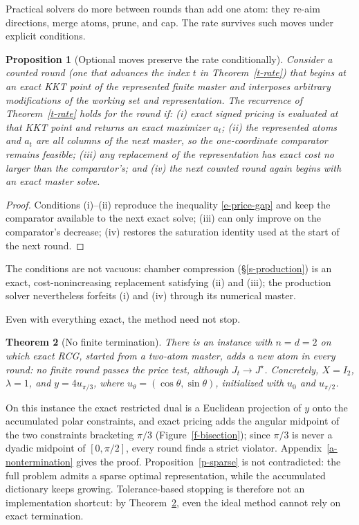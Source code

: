\documentclass[12pt]{article}
\theoremstyle{plain}
\newtheorem{theorem}{Theorem}
\newtheorem{proposition}[theorem]{Proposition}
\theoremstyle{definition}
\begin{document}
Practical solvers do more between rounds than add one atom: they re-aim
directions, merge atoms, prune, and cap. The rate survives such moves under
explicit conditions.

\begin{proposition}[Optional moves preserve the rate conditionally]
\label{p-optional}
Consider a counted round (one that advances the index $t$ in
Theorem~\ref{t-rate}) that begins at an exact KKT point of the represented
finite master and interposes arbitrary modifications of the working set and
representation. The recurrence of Theorem~\ref{t-rate} holds for the round if:
(i) exact signed pricing is evaluated at that KKT point and returns an exact
maximizer $a_t$; (ii) the represented atoms and $a_t$ are all columns of the
next master, so the one-coordinate comparator remains feasible; (iii) any
replacement of the representation has exact cost no larger than the
comparator's; and (iv) the next counted round again begins with an exact
master solve.
\end{proposition}

\begin{proof}
Conditions (i)--(ii) reproduce the inequality \eqref{e-price-gap} and keep the
comparator available to the next exact solve; (iii) can only improve on the
comparator's decrease; (iv) restores the saturation identity used at the start
of the next round.
\end{proof}

The conditions are not vacuous: chamber compression (\S\ref{s-production}) is
an exact, cost-nonincreasing replacement satisfying (ii) and (iii); the
production solver nevertheless forfeits (i) and (iv) through its numerical
master.

Even with everything exact, the method need not stop.

\begin{theorem}[No finite termination]\label{t-nontermination}
There is an instance with $n=d=2$ on which exact RCG, started from a
two-atom master, adds a new atom in every round: no finite round passes the
price test, although $J_t\to J^\star$. Concretely, $X=I_2$, $\lambda=1$, and
$y=4u_{\pi/3}$, where $u_\theta=(\cos\theta,\sin\theta)$, initialized with
$u_0$ and $u_{\pi/2}$.
\end{theorem}

On this instance the exact restricted dual is a Euclidean projection of $y$
onto the accumulated polar constraints, and exact pricing adds the angular
midpoint of the two constraints bracketing $\pi/3$ (Figure~\ref{f-bisection});
since $\pi/3$ is never a dyadic midpoint of $[0,\pi/2]$, every round finds a
strict violator. Appendix~\ref{a-nontermination} gives the proof.
Proposition~\ref{p-sparse} is not contradicted: the full problem admits a
sparse optimal representation, while the accumulated dictionary keeps growing.
Tolerance-based stopping is therefore not an implementation shortcut: by
Theorem~\ref{t-nontermination}, even the ideal method cannot rely on exact
termination.
\end{document}
